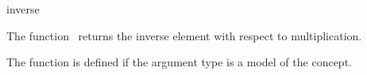 \begin{ccRefFunction}{inverse}

\ccDefinition

The function \ccRefName\ returns the inverse element with respect to multiplication.

The function is defined if the argument type 
is a model of the  concept. 


{}



\ccSeeAlso

\\
\\

\end{ccRefFunction}
